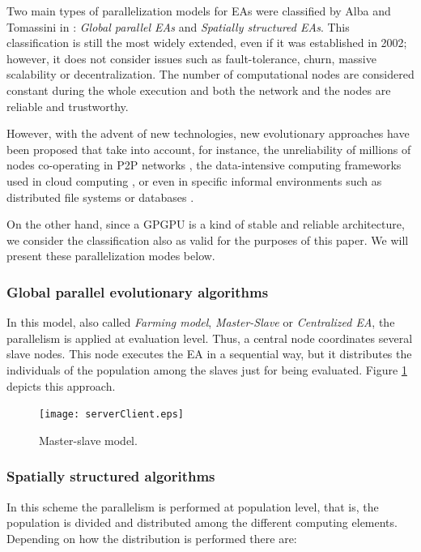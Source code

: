 \documentclass{article}
\begin{document}
Two main types of parallelization models for EAs were classified by Alba and Tomassini in \cite{Alba02Parallelism}: \textit{Global parallel EAs} and
\textit{Spatially structured EAs}. This classification is still the
most widely extended, even if it was established in 2002; however, it
does not consider issues such as fault-tolerance, churn, massive
scalability or decentralization. The number of computational nodes are
considered constant during the whole execution and both the network
and the nodes are reliable and trustworthy.

However, with the advent of new technologies, new evolutionary approaches have been proposed that take into account, for instance, the unreliability of millions of nodes co-operating in P2P networks \cite{laredo2010evag}, the data-intensive computing frameworks used in cloud computing \cite{VermaCloud10}, or even in specific informal environments such as distributed file systems or databases \cite{Meri_CloudEA13,Merelo_Couch13}.

On the other hand, since a GPGPU is a kind of
stable and reliable architecture, we consider the classification also
as valid for the purposes of this paper. We will present these
parallelization modes below.

\subsubsection{Global parallel evolutionary algorithms}
In this model, also called \textit{Farming model},
\textit{Master-Slave} or \textit{Centralized EA}, the parallelism is
applied at evaluation level. Thus, a central node coordinates several
slave nodes. This node executes the EA in a sequential way, but it
distributes the individuals of the population among the slaves just
for being evaluated. Figure \ref{fig:serverClient} depicts this
approach.

\begin{figure}[tb]
\centering
\texttt{[image: serverClient.eps]}
\caption{Master-slave model.}
\label{fig:serverClient}
\end{figure}

\subsubsection{Spatially structured algorithms}
In this scheme the parallelism is performed at population level, that is, the population is divided and distributed among the different computing elements. Depending on how the distribution is performed there are:
\end{document}
